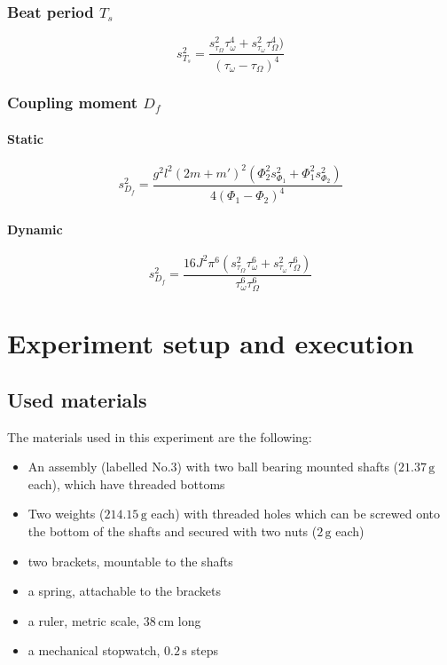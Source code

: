 \documentclass{scrreprt}
\newcommand{\unit}[1]{\ensuremath{\, \mathrm{#1}}}
\begin{document}
\subsubsection{Beat period $T_s$}
\begin{equation}
s_{T_s}^2 = \frac{s_{\tau_{\Omega}}^2 \tau_{\omega}^4 + s_{\tau_{\omega}}^2 \tau_{\Omega}^4 )}{\left( \tau_{\omega} - \tau_{\Omega} \right)^4}
\end{equation}

\subsubsection{Coupling moment $D_f$}

\paragraph*{Static}
\begin{equation}
s_{D_f}^2 = \frac{g^2 l^2 \left(2 m + m'\right)^2 \left( \Phi_2^2 s_{\Phi_1}^2 + \Phi_1^2 s_{\Phi_2}^2 \right)}{4 \left(\Phi_1 -\Phi_2\right)^4} 
\end{equation}

\paragraph*{Dynamic}
\begin{equation}
s_{D_f}^2 = \frac{16 J^2 \pi^6 \left( s_{\tau_{\Omega}}^2 \tau_{\omega}^6 + s_{\tau_{\omega}}^2 \tau_{\Omega}^6 \right)}{\tau_{\omega}^6 \tau_{\Omega}^6}
\end{equation}

\section{Experiment setup and execution}

\subsection{Used materials}
The materials used in this experiment are the following:
\begin{itemize}
\item An assembly (labelled No.$3$) with two ball bearing mounted shafts ($21.37\unit{g}$ each), which have threaded bottoms
\item Two weights ($214.15 \unit{g}$ each) with threaded holes which can be screwed onto the bottom of the shafts and secured with two nuts ($2\unit{g}$ each)
\item two brackets, mountable to the shafts
\item a spring, attachable to the brackets 
\item a ruler, metric scale, $38 \unit{cm}$ long
\item a mechanical stopwatch, $0.2 \unit{s}$ steps
\end{itemize}
\end{document}
